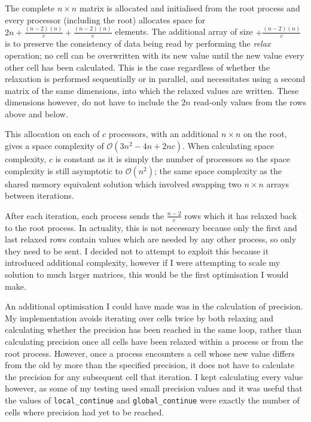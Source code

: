 \documentclass[12pt]{article}
\begin{document}
The complete $n\times{n}$ matrix is allocated and initialised from the root process and every processor (including the root) allocates space for $2n+\frac{(n-2)(n)}{c} +\frac{(n-2)(n)}{c}$ elements. The additional array of size $+\frac{(n-2)(n)}{c}$ is to preserve the consistency of data being read by performing the \textit{relax} operation; no cell can be overwritten with its new value until the new value every other cell has been calculated. This is the case regardless of whether the relaxation is performed sequentially or in parallel, and necessitates using a second matrix of the same dimensions, into which the relaxed values are written. These dimensions however, do not have to include the $2n$ read-only values from the rows above and below.

This allocation on each of $c$ processors, with an additional $n\times{n}$ on the root, gives a space complexity of $\mathcal{O}(3n^2 -4n + 2nc)$. When calculating space complexity, $c$ is constant as it is simply the number of processors so the space complexity is still asymptotic to $\mathcal{O}(n^2)$; the same space complexity as the shared memory equivalent solution which involved swapping two $n\times{n}$ arrays between iterations.

After each iteration, each process sends the $\frac{n-2}{c}$ rows which it has relaxed back to the root process. In actuality, this is not necessary because only the first and last relaxed rows contain values which are needed by any other process, so only they need to be sent. I decided not to attempt to exploit this because it introduced additional complexity, however if I were attempting to scale my solution to much larger matrices, this would be the first optimisation I would make.

An additional optimisation I could have made was in the calculation of precision. My implementation avoids iterating over cells twice by both relaxing and calculating whether the precision has been reached in the same loop, rather than calculating precision once all cells have been relaxed within a process or from the root process. However, once a process encounters a cell whose new value differs from the old by more than the specified precision, it does not have to calculate the precision for any subsequent cell that iteration. I kept calculating every value however, as some of my testing used small precision values and it was useful that the values of \texttt{local\_continue} and \texttt{global\_continue} were exactly the number of cells where precision had yet to be reached.
\end{document}

